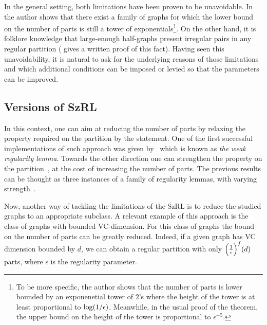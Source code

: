     In the general setting, both limitations have been proven to be unavoidable.
    In~\cite{lower_bounds_of_tower_type_for_szeremedis_uniformity_lemma} the author shows that there exist a family of graphs
    for which the lower bound on the number of parts is still a tower of exponentials\footnote{
    To be more specific, the author shows that the number of parts is lower bounded by an exponenetial tower of $2$'s where
        the height of the tower is at least proportional to $\log( 1/\epsilon )$.
        Meanwhile, in the usual proof of the theorem, the upper bound on the height of the tower is proportional to
        $\epsilon^{-5}$.
    }.
    On the other hand, it is folklore knowledge that large-enough half-graphs present irregular pairs in any
    regular partition (\cite{irregular_pairs_in_half_graphs_szemeredi_regularity} gives a written proof of this fact).
    Having seen this unavoidability, it is natural to ask for the underlying reasons of those limitations and which
    additional conditions can be imposed or levied so that the parameters can be improved.


    \subsection{Versions of SzRL}
    In this context, one can aim at reducing the number of parts by relaxing the property required on the partition
    by the statement.
    One of the first successful implementations of such approach was given
    by~\cite[Theorem ??]{quick_approximation_to_matrices_and_applications} which is known as
    \emph{the weak regularity lemma}.
    Towards the other direction one can strengthen the property on the
    partition~\cite[Theorem ??]{efficient_testing_of_large_graphs}, at the cost of increasing the number of parts.
    The previous results can be thought as three instances of a family of regularity lemmas, with varying
    strength~\cite{szemeredis_lemma_for_the_analyst, regularity_partitions_and_the_topology_of_graphons}.

    Now, another way of tackling the limitations of the SzRL is to reduce the studied graphs to an appropriate subclass.
    A relevant example of this approach is the class of graphs with bounded VC-dimension.
    For this class of graphs the bound on the number of parts can be greatly reduced.
    Indeed, if a given graph has VC dimension bounded by $d$, we can obtain a regular partition with only
    $\Bigl( \frac{1}{\epsilon} \Bigr)^f(d)$ parts, where $\epsilon$ is the regularity parameter.


